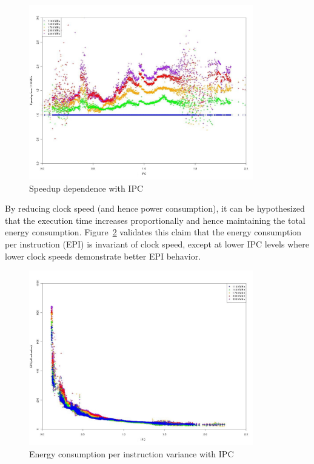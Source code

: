 \begin{figure}[h!]
  \begin{center}
    \includegraphics[height=3in]{figures/ipc_speedup.jpg}%
    \caption{Speedup dependence with IPC}
  \end{center}
  \label{fig:ipc_speedup}
\end{figure}

By reducing clock speed (and hence power consumption), it can be hypothesized that the execution time
increases proportionally and hence maintaining the total energy consumption.
Figure~\ref{fig:ipc_epi} validates this claim that 
the energy consumption per instruction (EPI) is invariant of clock speed, except at lower IPC levels
where lower clock speeds demonstrate better EPI behavior.

\begin{figure}[h!]
  \begin{center}
    \includegraphics[height=3in]{figures/ipc_epi.jpg}%
    \caption{Energy consumption per instruction variance with IPC}
    \label{fig:ipc_epi}
  \end{center}
\end{figure}

